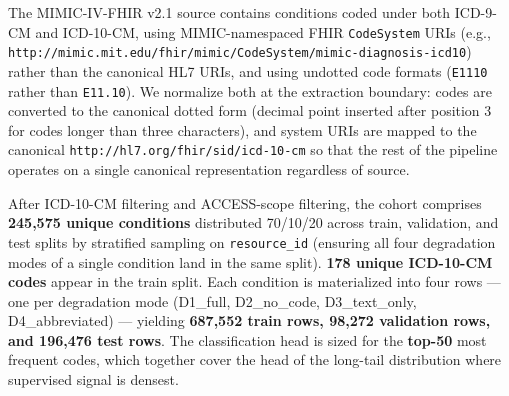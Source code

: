 The MIMIC-IV-FHIR v2.1 source contains conditions coded under both
ICD-9-CM and ICD-10-CM, using MIMIC-namespaced FHIR \texttt{CodeSystem}
URIs (e.g.,
\texttt{http://mimic.mit.edu/fhir/mimic/CodeSystem/mimic-diagnosis-icd10})
rather than the canonical HL7 URIs, and using undotted code
formats (\texttt{E1110} rather than \texttt{E11.10}). We normalize both at the
extraction boundary: codes are converted to the canonical dotted
form (decimal point inserted after position 3 for codes longer
than three characters), and system URIs are mapped to the
canonical \texttt{http://hl7.org/fhir/sid/icd-10-cm} so that the rest of
the pipeline operates on a single canonical representation
regardless of source.

After ICD-10-CM filtering and ACCESS-scope filtering, the cohort
comprises \textbf{245,575 unique conditions} distributed 70/10/20
across train, validation, and test splits by stratified sampling
on \texttt{resource\_id} (ensuring all four degradation modes of a single
condition land in the same split). \textbf{178 unique ICD-10-CM codes}
appear in the train split. Each condition is materialized into
four rows --- one per degradation mode (D1\_full, D2\_no\_code,
D3\_text\_only, D4\_abbreviated) --- yielding \textbf{687,552 train rows,
98,272 validation rows, and 196,476 test rows}. The
classification head is sized for the \textbf{top-50} most frequent
codes, which together cover the head of the long-tail distribution
where supervised signal is densest.
